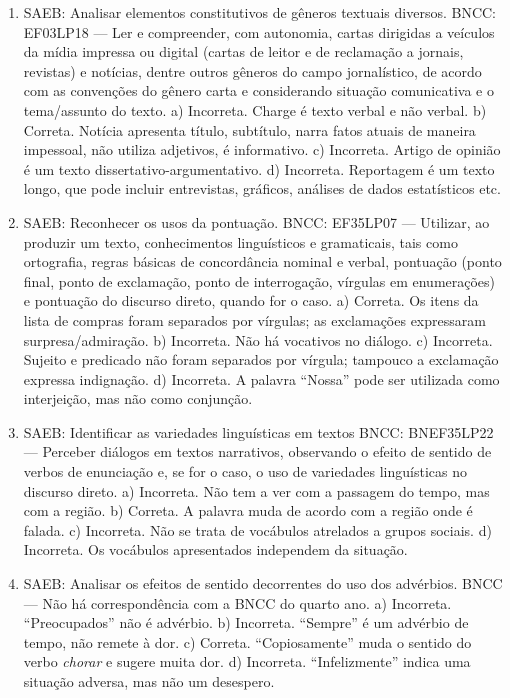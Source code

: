 \begin{enumerate}
\item
SAEB: Analisar elementos constitutivos de gêneros textuais diversos. BNCC: EF03LP18 --- Ler e compreender, com autonomia, cartas dirigidas a veículos da mídia impressa ou digital (cartas de leitor e de reclamação a jornais, revistas) e notícias, dentre outros gêneros do campo jornalístico, de acordo com as convenções do gênero carta e considerando situação comunicativa e o tema/assunto do texto. a) Incorreta. Charge é texto verbal e não verbal. b) Correta. Notícia apresenta título, subtítulo, narra fatos atuais de maneira impessoal, não utiliza adjetivos, é informativo. c) Incorreta. Artigo de opinião é um texto dissertativo-argumentativo. d) Incorreta. Reportagem é um texto longo, que pode incluir entrevistas,
gráficos, análises de dados estatísticos etc.

\item
SAEB: Reconhecer os usos da pontuação. BNCC: EF35LP07 --- Utilizar, ao produzir um texto, conhecimentos linguísticos e gramaticais, tais como ortografia, regras básicas de concordância nominal e verbal, pontuação (ponto final, ponto de exclamação, ponto de interrogação, vírgulas em enumerações) e pontuação do discurso direto, quando for o caso. a) Correta. Os itens da lista de compras foram separados por vírgulas; as exclamações expressaram surpresa/admiração. b) Incorreta. Não há vocativos no diálogo. c) Incorreta. Sujeito e predicado não foram separados por vírgula; tampouco a exclamação expressa indignação. d) Incorreta. A palavra ``Nossa'' pode ser utilizada como interjeição, mas não como conjunção.

\item
SAEB: Identificar as variedades linguísticas em textos BNCC: BNEF35LP22 --- Perceber diálogos em textos narrativos, observando o efeito de sentido de verbos de enunciação e, se for o caso, o uso de variedades linguísticas no discurso direto. a) Incorreta. Não tem a ver com a passagem do tempo, mas com a região. b) Correta. A palavra muda de acordo com a região onde é falada. c) Incorreta. Não se trata de vocábulos atrelados a grupos sociais. d) Incorreta. Os vocábulos apresentados independem da situação.

\item
SAEB: Analisar os efeitos de sentido decorrentes do uso dos advérbios. BNCC --- Não há correspondência com a BNCC do quarto ano. a) Incorreta. ``Preocupados'' não é advérbio. b) Incorreta. ``Sempre'' é um advérbio de tempo, não remete à dor. c) Correta. ``Copiosamente'' muda o sentido do verbo \emph{chorar} e sugere muita dor. d) Incorreta. ``Infelizmente'' indica uma situação adversa, mas não um desespero.


\end{enumerate}
